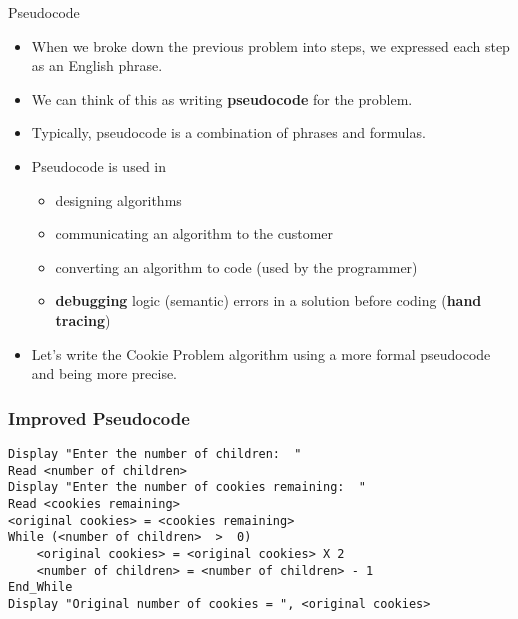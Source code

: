 \documentclass[graphics]{beamer}
\begin{document}
\begin{frame}{Pseudocode}
     {
        \begin{itemize}
            \item When we broke down the previous problem into steps, we expressed each step as an English phrase.
            \item We can think of this as writing \textbf{pseudocode} for the problem.
            \item Typically, pseudocode is a combination of phrases and formulas.
        \end{itemize}
    }
     {
        \begin{itemize}
            \item Pseudocode is used in
            \begin{itemize}
                \item designing algorithms
                \item communicating an algorithm to the customer
                \item converting an algorithm to code (used by the programmer)
                \item \textbf{debugging} logic (semantic) errors in a solution before coding (\textbf{hand tracing})
            \end{itemize}
            \item Let’s write the Cookie Problem algorithm using a more formal pseudocode and being more precise.
        \end{itemize}
    }
\end{frame}

\begin{frame}[fragile]\frametitle{Improved Pseudocode}
    \begin{verbatim}
Display "Enter the number of children:  "
Read <number of children>
Display "Enter the number of cookies remaining:  "
Read <cookies remaining>
<original cookies> = <cookies remaining>
While (<number of children>  >  0)
    <original cookies> = <original cookies> X 2
    <number of children> = <number of children> - 1
End_While
Display "Original number of cookies = ", <original cookies>
    \end{verbatim}
\end{frame}
\end{document}
